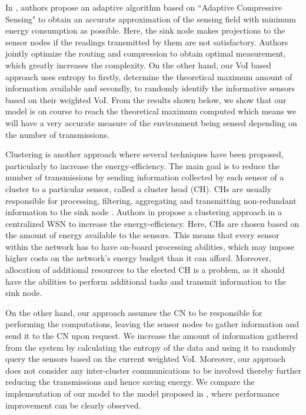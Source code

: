In \cite{chou2009energy}, authors propose an adaptive algorithm based
on ``Adaptive Compressive Sensing" to obtain an accurate
approximation of the sensing field with minimum energy consumption as
possible. Here, the sink node makes projections to the sensor nodes if
the readings transmitted by them are not satisfactory. Authors jointly
optimize the routing and compression to obtain optimal measurement,
which greatly increases the complexity.  On the other hand, our VoI
based approach uses entropy to firstly, determine the theoretical
maximum amount of information available and secondly, to randomly identify
the informative sensors based on their weighted VoI. From the results shown
below, we show that our model is on course to reach the theoretical maximum
computed which means we will have a very accurate measure of the environment
being sensed depending on the number of transmissions.

Clustering is another approach where several techniques have been
proposed, particularly to increase the energy-efficiency. The main
goal is to reduce the number of transmissions by sending information
collected by each sensor of a cluster to a particular sensor, called a
cluster head (CH). CHs are usually responsible for processing,
filtering, aggregating and transmitting non-redundant information to
the sink node \cite{heinzelman2000energy} \cite{lindsey2002pegasis}
\cite{younis2004heed}. Authors in \cite{muruganathan2005centralized}
propose a clustering approach in a centralized WSN to increase the
energy-efficiency. Here, CHs are chosen based on the amount of energy
available to the sensors. This means that every sensor within the
network has to have on-board processing abilities, which may impose
higher costs on the network's energy budget than it can afford.
Moreover, allocation of additional resources to the elected CH is a
problem, as it should have the abilities to perform additional tasks
and transmit information to the sink node.

On the other hand, our approach assumes the CN to be responsible for
performing the computations, leaving the sensor nodes to gather
information and send it to the CN upon request. We increase the amount
of information gathered from the system by calculating the entropy of
the data and using it to randomly query the sensors based on the current
weighted VoI. Moreover, our approach does not consider any inter-cluster
communications to be involved thereby further reducing the transmissions
and hence saving energy. We compare the implementation of our model to
the model proposed in \cite{muruganathan2005centralized}, where performance
improvement can be clearly observed.
	

